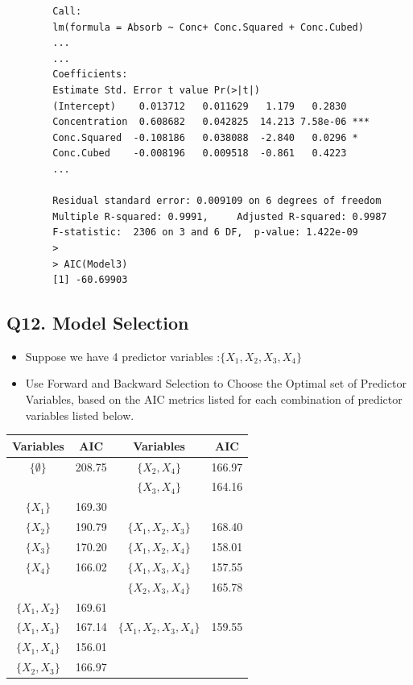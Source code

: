 \documentclass[a4paper,12pt]{article}
\begin{document}
\begin{itemize}
\begin{framed}
\begin{verbatim}
		Call:
		lm(formula = Absorb ~ Conc+ Conc.Squared + Conc.Cubed)
		...
		...
		Coefficients:
		Estimate Std. Error t value Pr(>|t|)
		(Intercept)    0.013712   0.011629   1.179   0.2830
		Concentration  0.608682   0.042825  14.213 7.58e-06 ***
		Conc.Squared  -0.108186   0.038088  -2.840   0.0296 *
		Conc.Cubed    -0.008196   0.009518  -0.861   0.4223
		...
		
		Residual standard error: 0.009109 on 6 degrees of freedom
		Multiple R-squared: 0.9991,     Adjusted R-squared: 0.9987
		F-statistic:  2306 on 3 and 6 DF,  p-value: 1.422e-09
		>
		> AIC(Model3)
		[1] -60.69903
		\end{verbatim}
	\end{framed}
\end{itemize}
\newpage
\newpage
\subsection*{Q12. Model Selection}

\begin{itemize}
	\item Suppose we have 4 predictor variables :$\{ X_1,X_2,X_3,X_4 \} $\item 
Use Forward and Backward Selection to Choose the Optimal set of Predictor Variables, based on the AIC metrics listed for each combination of predictor variables listed below.
\end{itemize}
{
	\large
\begin{center}
\begin{tabular}{||c|c||c|c||}
	\hline Variables  & AIC & Variables & AIC \\ \hline
	\hline    $\{ \emptyset \} $   & 208.75   &  $\{ X_2,X_4 \} $    & 166.97 \\ \hline 
	\phantom{makespace} & \phantom{makespace} & $\{ X_3,X_4 \} $& 164.16\\
	\hline    $\{ X_1 \} $     &  169.30   &    &  \\ 
	\hline    $\{ X_2 \} $     &  190.79   &  $\{ X_1,X_2,X_3 \}$  & 168.40 \\ \hline
	 $\{ X_3 \} $  & 170.20 &$\{ X_1,X_2,X_4 \} $  & 158.01\\ 
	\hline    $\{ X_4 \} $      &  166.02   &   $\{ X_1,X_3,X_4 \} $  & 157.55\\ 
	\hline        &     &    $\{ X_2,X_3,X_4 \} $  & 165.78 \\ 
	\hline    $\{ X_1,X_2 \} $ &  169.61   &     &  \\ 
	\hline    $\{ X_1,X_3 \} $ &  167.14   &   $\{ X_1,X_2,X_3,X_4 \} $&  159.55\\ 
	\hline    $\{ X_1,X_4 \} $ &  156.01   &    &  \\ 
	\hline $\{ X_2,X_3 \} $ & 166.97 &\phantom{makespace}& \phantom{makespace}\\
	\hline
\end{tabular} 
\end{center}
}
\newpage
\end{document}
